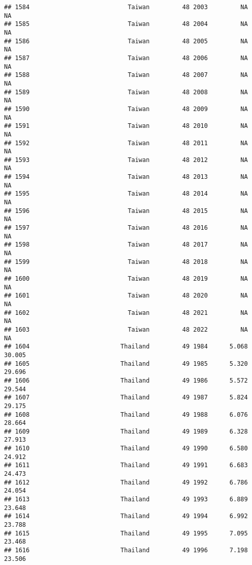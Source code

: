 \documentclass[
]{article}
\begin{document}
\begin{verbatim}
## 1584                           Taiwan         48 2003         NA         NA
## 1585                           Taiwan         48 2004         NA         NA
## 1586                           Taiwan         48 2005         NA         NA
## 1587                           Taiwan         48 2006         NA         NA
## 1588                           Taiwan         48 2007         NA         NA
## 1589                           Taiwan         48 2008         NA         NA
## 1590                           Taiwan         48 2009         NA         NA
## 1591                           Taiwan         48 2010         NA         NA
## 1592                           Taiwan         48 2011         NA         NA
## 1593                           Taiwan         48 2012         NA         NA
## 1594                           Taiwan         48 2013         NA         NA
## 1595                           Taiwan         48 2014         NA         NA
## 1596                           Taiwan         48 2015         NA         NA
## 1597                           Taiwan         48 2016         NA         NA
## 1598                           Taiwan         48 2017         NA         NA
## 1599                           Taiwan         48 2018         NA         NA
## 1600                           Taiwan         48 2019         NA         NA
## 1601                           Taiwan         48 2020         NA         NA
## 1602                           Taiwan         48 2021         NA         NA
## 1603                           Taiwan         48 2022         NA         NA
## 1604                         Thailand         49 1984      5.068     30.005
## 1605                         Thailand         49 1985      5.320     29.696
## 1606                         Thailand         49 1986      5.572     29.544
## 1607                         Thailand         49 1987      5.824     29.175
## 1608                         Thailand         49 1988      6.076     28.664
## 1609                         Thailand         49 1989      6.328     27.913
## 1610                         Thailand         49 1990      6.580     24.912
## 1611                         Thailand         49 1991      6.683     24.473
## 1612                         Thailand         49 1992      6.786     24.054
## 1613                         Thailand         49 1993      6.889     23.648
## 1614                         Thailand         49 1994      6.992     23.788
## 1615                         Thailand         49 1995      7.095     23.468
## 1616                         Thailand         49 1996      7.198     23.506

\end{verbatim}
\end{document}

